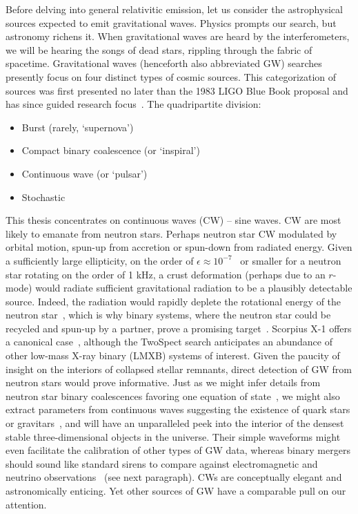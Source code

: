Before delving into general relativitic emission, let us consider the astrophysical sources expected to emit gravitational waves. 
Physics prompts our search, but astronomy richens it.
When gravitational waves are heard by the interferometers, we will be hearing the songs of dead stars, rippling through the fabric of spacetime.  
Gravitational waves (henceforth also abbreviated GW) searches presently focus on four distinct types of cosmic sources.
This categorization of sources was first presented no later than the 1983 LIGO Blue Book proposal and has since guided research focus~\cite{CollinsGravityShadow,Schutz1989}. 
The quadripartite division:
\begin{itemize}
\item Burst (rarely, `supernova')
\item Compact binary coalescence (or `inspiral')
\item Continuous wave (or `pulsar')
\item Stochastic
\end{itemize}

This thesis concentrates on continuous waves (CW) -- sine waves. 
CW are most likely to emanate from neutron stars. 
Perhaps neutron star CW modulated by orbital motion, spun-up from accretion or spun-down from radiated energy. 
Given a sufficiently large ellipticity, on the order of $\epsilon \approx 10^{-7}$~\cite{Owen2005} or smaller for a neutron star rotating on the order of 1 kHz, a crust deformation (perhaps due to an $r$-mode) would radiate sufficient gravitational radiation to be a plausibly detectable source. 
Indeed, the radiation would rapidly deplete the rotational energy of the neutron star~\cite{Owen1998}, which is why binary systems, where the neutron star could be recycled and spun-up by a partner, prove a promising target~\cite{PapaloizouPringle1978,Wagoner1984}. 
Scorpius X-1 offers a canonical case~\cite{AbbottScoX12007}, although the TwoSpect search anticipates an abundance of other low-mass X-ray binary (LMXB) systems of interest. 
Given the paucity of insight on the interiors of collapsed stellar remnants, direct detection of GW from neutron stars would prove informative. 
Just as we might infer details from neutron star binary coalescences favoring one equation of state~\cite{Lattimer2007,Read2009}, we might also extract parameters from continuous waves suggesting the existence of quark stars or gravitars~\cite{Owen2005}, and will have an unparalleled peek into the interior of the densest stable three-dimensional objects in the universe. 
Their simple waveforms might even facilitate the calibration of other types of GW data, whereas binary mergers should sound like standard sirens to compare against electromagnetic and neutrino observations~\cite{Punturo2010}
(see next paragraph).
CWs are conceptually elegant and astronomically enticing.
Yet other sources of GW have a comparable pull on our attention. 

